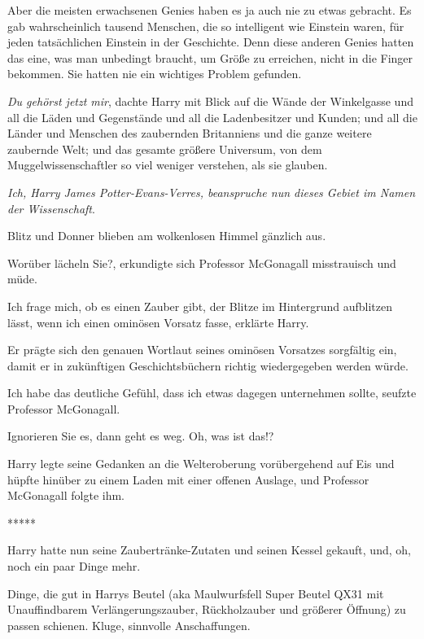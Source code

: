 Aber die meisten erwachsenen Genies haben es ja auch nie zu etwas gebracht. Es
gab wahrscheinlich tausend Menschen, die so intelligent wie Einstein waren, für
jeden tatsächlichen Einstein in der Geschichte. Denn diese anderen Genies hatten
das eine, was man unbedingt braucht, um Größe zu erreichen, nicht in die Finger
bekommen. Sie hatten nie ein wichtiges Problem gefunden.

\emph{Du gehörst jetzt mir}, dachte Harry mit Blick auf die Wände der
Winkelgasse und all die Läden und Gegenstände und all die Ladenbesitzer und
Kunden; und all die Länder und Menschen des zaubernden Britanniens und die ganze
weitere zaubernde Welt; und das gesamte größere Universum, von dem
Muggelwissenschaftler so viel weniger verstehen, als sie glauben.

\emph{Ich, Harry James Potter-Evans-Verres, beanspruche nun dieses Gebiet im
Namen der Wissenschaft}.

Blitz und Donner blieben am wolkenlosen Himmel gänzlich aus.

\glqq Worüber lächeln Sie?\grqq{}, erkundigte sich Professor McGonagall
misstrauisch und müde.

\glqq Ich frage mich, ob es einen Zauber gibt, der Blitze im Hintergrund
aufblitzen lässt, wenn ich einen ominösen Vorsatz fasse\grqq{}, erklärte Harry.

Er prägte sich den genauen Wortlaut seines ominösen Vorsatzes sorgfältig ein,
damit er in zukünftigen Geschichtsbüchern richtig wiedergegeben werden würde.

\glqq Ich habe das deutliche Gefühl, dass ich etwas dagegen unternehmen
sollte\grqq{}, seufzte Professor McGonagall.

\glqq Ignorieren Sie es, dann geht es weg. Oh, was ist das!?\grqq{}

Harry legte seine Gedanken an die Welteroberung vorübergehend auf Eis und hüpfte
hinüber zu einem Laden mit einer offenen Auslage, und Professor McGonagall
folgte ihm.

\begin{center}*****\end{center}

Harry hatte nun seine Zaubertränke-Zutaten und seinen Kessel gekauft, und, oh,
noch ein paar Dinge mehr.

Dinge, die gut in Harrys Beutel (aka Maulwurfsfell Super Beutel QX31 mit
Unauffindbarem Verlängerungszauber, Rückholzauber und größerer Öffnung) zu
passen schienen. Kluge, sinnvolle Anschaffungen.

